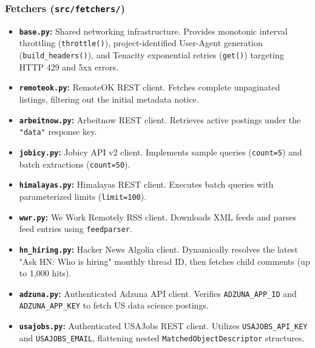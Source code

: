 \documentclass[10pt,letterpaper]{article}
\begin{document}
\subsubsection{Fetchers (\texttt{src/fetchers/})}
\begin{itemize}[leftmargin=1.5em]
    \item \textbf{\texttt{base.py}:} Shared networking infrastructure. Provides monotonic interval throttling (\texttt{throttle()}), project-identified User-Agent generation (\texttt{build\_headers()}), and Tenacity exponential retries (\texttt{get()}) targeting HTTP 429 and 5xx errors.
    \item \textbf{\texttt{remoteok.py}:} RemoteOK REST client. Fetches complete unpaginated listings, filtering out the initial metadata notice.
    \item \textbf{\texttt{arbeitnow.py}:} Arbeitnow REST client. Retrieves active postings under the \texttt{"data"} response key.
    \item \textbf{\texttt{jobicy.py}:} Jobicy API v2 client. Implements sample queries (\texttt{count=5}) and batch extractions (\texttt{count=50}).
    \item \textbf{\texttt{himalayas.py}:} Himalayas REST client. Executes batch queries with parameterized limits (\texttt{limit=100}).
    \item \textbf{\texttt{wwr.py}:} We Work Remotely RSS client. Downloads XML feeds and parses feed entries using \texttt{feedparser}.
    \item \textbf{\texttt{hn\_hiring.py}:} Hacker News Algolia client. Dynamically resolves the latest "Ask HN: Who is hiring" monthly thread ID, then fetches child comments (up to 1,000 hits).
    \item \textbf{\texttt{adzuna.py}:} Authenticated Adzuna API client. Verifies \texttt{ADZUNA\_APP\_ID} and \texttt{ADZUNA\_APP\_KEY} to fetch US data science postings.
    \item \textbf{\texttt{usajobs.py}:} Authenticated USAJobs REST client. Utilizes \texttt{USAJOBS\_API\_KEY} and \texttt{USAJOBS\_EMAIL}, flattening nested \texttt{MatchedObjectDescriptor} structures.
\end{itemize}
\end{document}
